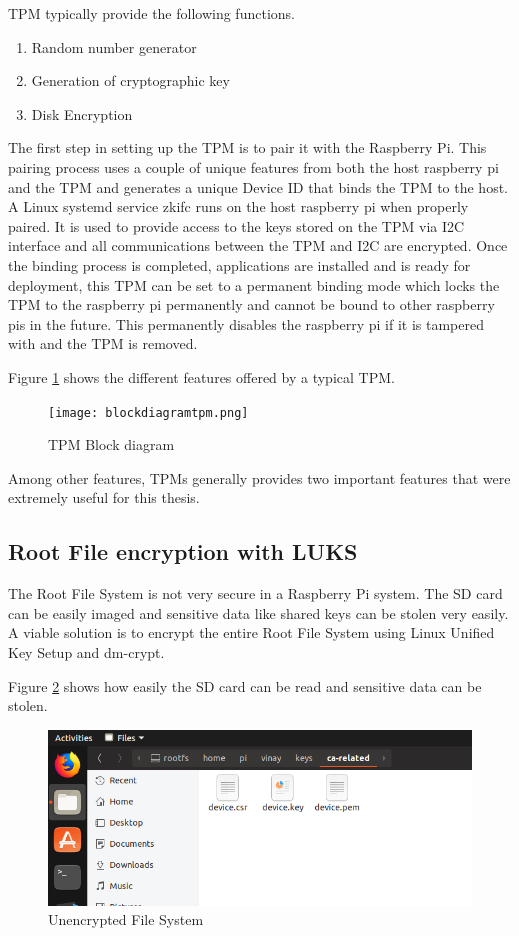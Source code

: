 \documentclass[11pt,openright]{report}
\begin{document}
TPM typically provide the following functions.
\begin{enumerate}
	\item Random number generator
	\item Generation of cryptographic key
	\item Disk Encryption
\end{enumerate}

The first step in setting up the TPM is to pair it with the Raspberry Pi. This pairing process uses a couple of unique features from both the host raspberry pi and the TPM and generates a unique Device ID that binds the TPM to the host. A Linux systemd service zkifc runs on the host raspberry pi when properly paired. It is used to provide access to the keys stored on the TPM via I2C interface and all communications between the TPM and I2C are encrypted. Once the binding process is completed, applications are installed and is ready for deployment, this TPM can be set to a permanent binding mode which locks the TPM to the raspberry pi permanently and cannot be bound to other raspberry pis in the future. This permanently disables the raspberry pi if it is tampered with and the TPM is removed.

Figure \ref{fig:blockdiagramtpm} shows the different features offered by a typical TPM.
\begin{figure}
	\centering
	\texttt{[image: blockdiagramtpm.png]}
	\caption{TPM Block diagram}
	\label{fig:blockdiagramtpm}
\end{figure}



Among other features, TPMs generally provides two important features that were extremely useful for this thesis.
\subsection{Root File encryption with LUKS}
The Root File System is not very secure in a Raspberry Pi system. The SD card can be easily imaged and sensitive data like shared keys can be stolen very easily. A viable solution is to encrypt the entire Root File System using Linux Unified Key Setup and dm-crypt.

Figure \ref{fig:normal_fs} shows how easily the SD card can be read and sensitive data can be stolen.

\begin{figure}
    \centering
    \includegraphics[scale=1]{images/3_NormalFS.png}
    \caption{Unencrypted File System}
    \label{fig:normal_fs}
\end{figure}
\end{document}
